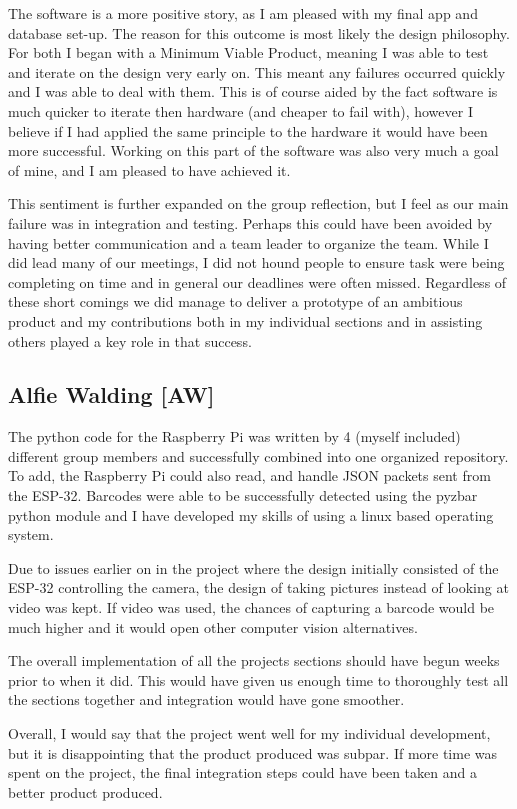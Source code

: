 The software is a more positive story, as I am pleased with my final app and database set-up.
The reason for this outcome is most likely the design philosophy.
For both I began with a Minimum Viable Product, meaning I was able to test and iterate on the design very early on.
This meant any failures occurred quickly and I was able to deal with them.
This is of course aided by the fact software is much quicker to iterate then hardware (and cheaper to fail with), however I believe if I had applied the same principle to the hardware it would have been more successful.
Working on this part of the software was also very much a goal of mine, and I am pleased to have achieved it.

This sentiment is further expanded on the group reflection, but I feel as our main failure was in integration and testing.
Perhaps this could have been avoided by having better communication and a team leader to organize the team.
While I did lead many of our meetings, I did not hound people to ensure task were being completing on time and in general our deadlines were often missed.
Regardless of these short comings we did manage to deliver a prototype of an ambitious product
and my contributions both in my individual sections and in assisting others played a key role in that success.

\subsection{Alfie Walding [AW]}
The python code for the Raspberry Pi was written by 4 (myself included) different group members and successfully combined into one organized repository.
To add, the Raspberry Pi could also read, and handle JSON packets sent from the ESP-32.
Barcodes were able to be successfully detected using the pyzbar python module and I have developed my skills of using a linux based operating system.

Due to issues earlier on in the project where the design initially consisted of the ESP-32 controlling the camera, the design of taking pictures instead of looking at video was kept.
If video was used, the chances of capturing a barcode would be much higher and it would open other computer vision alternatives.

The overall implementation of all the projects sections should have begun weeks prior to when it did.
This would have given us enough time to thoroughly test all the sections together and integration would have gone smoother.

Overall, I would say that the project went well for my individual development, but it is disappointing that the product produced was subpar.
If more time was spent on the project, the final integration steps could have been taken and a better product produced.

